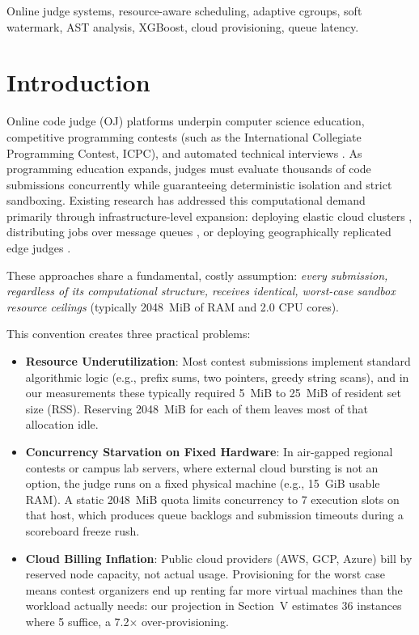 \documentclass[conference]{IEEEtran}
\begin{document}
\begin{IEEEkeywords}
Online judge systems, resource-aware scheduling, adaptive cgroups, soft watermark, AST analysis, XGBoost, cloud provisioning, queue latency.
\end{IEEEkeywords}

\section{Introduction}
Online code judge (OJ) platforms underpin computer science education, competitive programming contests (such as the International Collegiate Programming Contest, ICPC), and automated technical interviews \cite{wasik2018survey}. As programming education expands, judges must evaluate thousands of code submissions concurrently while guaranteeing deterministic isolation and strict sandboxing. Existing research has addressed this computational demand primarily through infrastructure-level expansion: deploying elastic cloud clusters \cite{pan2022cloud}, distributing jobs over message queues \cite{song2025idl}, or deploying geographically replicated edge judges \cite{wang2021metaoj}.

These approaches share a fundamental, costly assumption: \textit{every submission, regardless of its computational structure, receives identical, worst-case sandbox resource ceilings} (typically 2048~MiB of RAM and 2.0 CPU cores).

This convention creates three practical problems:
\begin{itemize}
    \item \textbf{Resource Underutilization}: Most contest submissions implement standard algorithmic logic (e.g., prefix sums, two pointers, greedy string scans), and in our measurements these typically required 5~MiB to 25~MiB of resident set size (RSS). Reserving 2048~MiB for each of them leaves most of that allocation idle.
    \item \textbf{Concurrency Starvation on Fixed Hardware}: In air-gapped regional contests or campus lab servers, where external cloud bursting is not an option, the judge runs on a fixed physical machine (e.g., 15~GiB usable RAM). A static 2048~MiB quota limits concurrency to 7 execution slots on that host, which produces queue backlogs and submission timeouts during a scoreboard freeze rush.
    \item \textbf{Cloud Billing Inflation}: Public cloud providers (AWS, GCP, Azure) bill by reserved node capacity, not actual usage. Provisioning for the worst case means contest organizers end up renting far more virtual machines than the workload actually needs: our projection in Section~V estimates 36 instances where 5 suffice, a 7.2$\times$ over-provisioning.
\end{itemize}
\end{document}
